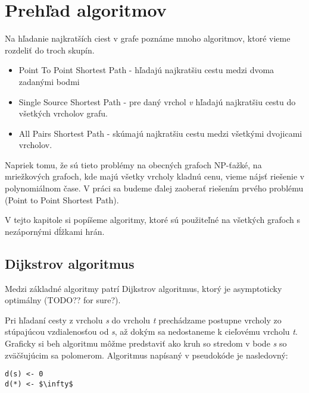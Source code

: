 \chapter{Prehľad algoritmov}
Na hľadanie najkratších ciest v grafe poznáme mnoho algoritmov, ktoré vieme rozdeliť do troch skupín.


\begin{itemize}
\item Point To Point Shortest Path - hľadajú najkratšiu cestu medzi dvoma zadanými bodmi
\item Single Source Shortest Path - pre daný vrchol {\sl v} hľadajú najkratšiu cestu do všetkých vrcholov grafu.
\item All Pairs Shortest Path - skúmajú najkratšiu cestu medzi všetkými dvojicami vrcholov.
\end{itemize}

Napriek tomu, že sú tieto problémy na obecných grafoch NP-ťažké, na mriežkových grafoch, kde majú všetky vrcholy kladnú cenu, vieme nájsť riešenie v polynomiálnom čase.
V práci sa budeme ďalej zaoberať riešením prvého problému (Point to Point Shortest Path).

V tejto kapitole si popíšeme algoritmy, ktoré sú použiteľné na všetkých grafoch 
s nezápornými dĺžkami hrán.

\section{Dijkstrov algoritmus}
Medzi základné algoritmy patrí Dijkstrov algoritmus, ktorý je asymptoticky optimálny (TODO?? for sure?).

Pri hľadaní cesty z vrcholu {\sl s} do vrcholu {\sl t} prechádzame postupne vrcholy zo stúpajúcou vzdialenosťou od {\sl s}, až dokým sa nedostaneme k cieľovému vrcholu {\sl t}.
Graficky si beh algoritmu môžme predstaviť ako kruh so stredom v bode {\sl s} so zväčšujúcim sa polomerom. Algoritmus napísaný v pseudokóde je nasledovný:

\begin{lstlisting}
d(s) <- 0
d(*) <- $\infty$


\end{lstlisting}



